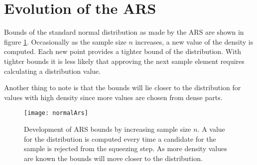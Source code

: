 \documentclass{article}
\begin{document}
\section*{Evolution of the ARS}
Bounds of the standard normal distribution as made by the ARS are shown in figure \ref{arsplot}. Occasionally as the 
sample size $n$ increases, a new value of the density is computed. Each new point provides a tighter bound of the distribution.
With tighter bounds it is less likely that approving the next sample element requires calculating a distribution value. 

Another thing to note is that the bounds will lie closer to the distribution for values with high density since more values are
chosen from dense parts.  


\begin{figure}[H]
\centering
\texttt{[image: normalArs]}
\caption{Development of ARS bounds by increasing sample size $n$. A value for the distribution is computed every time a 
candidate for the sample is rejected from the squeezing step. As more density values are known the bounds will move
closer to the distribution.}
\label{arsplot}
\end{figure}
\end{document}
